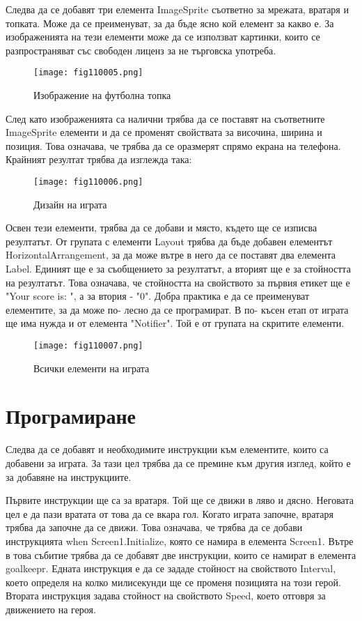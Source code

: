Следва да се добавят три елемента ImageSprite съответно за мрежата, вратаря и топката. Може да се преименуват, за да бъде ясно кой елемент за какво е. За изображенията на тези елементи може да се използват картинки, които се разпространяват със свободен лиценз за не търговска употреба.

\begin{figure}[H]
  \centering
  \texttt{[image: fig110005.png]}
  \caption{Изображение на футболна топка}
\label{fig110005}
\end{figure}

След като изображенията са налични трябва да се поставят на съответните ImageSprite елементи и да се променят свойствата за височина, ширина и позиция. Това означава, че трябва да се оразмерят спрямо екрана на телефона. Крайният резултат трябва да изглежда така:

\begin{figure}[H]
  \centering
  \texttt{[image: fig110006.png]}
  \caption{Дизайн на играта}
\label{fig110006}
\end{figure}

Освен тези елементи, трябва да се добави и място, където ще се изписва резултатът. От групата с елементи Layout трябва да бъде добавен елементът HorizontalArrangement, за да може вътре в него да се поставят два елемента Label. Единият ще е за съобщението за резултатът, а вторият ще е за стойността на резултатът. Това означава, че стойността на свойството за първия етикет ще е "Your score is: ", а за втория - "0". Добра практика е да се преименуват елементите, за да може по- лесно да се програмират. В по- късен етап от играта ще има нужда и от елемента "Notifier". Той е от групата на скритите елементи.

\begin{figure}[H]
  \centering
  \texttt{[image: fig110007.png]}
  \caption{Всички елементи на играта}
\label{fig110007}
\end{figure}

\section{Програмиране}
Следва да се добавят и необходимите инструкции към елементите, които са добавени за играта. За тази цел трябва да се премине към другия изглед, който е за добавяне на инструкциите.

Първите инструкции ще са за вратаря. Той ще се движи в ляво и дясно. Неговата цел е да пази вратата от това да се вкара гол. Когато играта започне, вратаря трябва да започне да се движи. Това означава, че трябва да се добави инструкцията when Screen1.Initialize, която се намира в елемента Screen1. Вътре в това събитие трябва да се добавят две инструкции, които се намират в елемента goalkeepr. Едната инструкция е да се зададе стойност на свойството Interval, което определя на колко милисекунди ще се променя позицията на този герой. Втората инструкция задава стойност на свойството Speed, което отговря за движението на героя.

